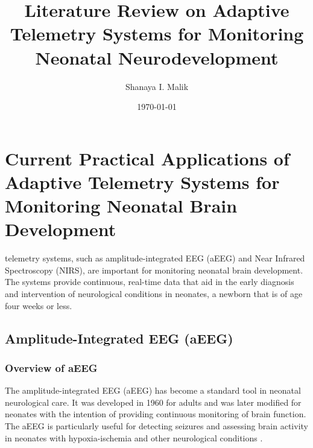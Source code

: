 \documentclass[12pt,journal,compsoc]{IEEEtran}
\begin{document}
\title{Literature Review on Adaptive Telemetry Systems for Monitoring Neonatal Neurodevelopment}
\author{Shanaya I. Malik}

\date{\today}

%


\maketitle


\section{Current Practical Applications of Adaptive Telemetry Systems for Monitoring Neonatal Brain Development}

 telemetry systems, such as amplitude-integrated EEG (aEEG) and Near Infrared Spectroscopy (NIRS), are important for monitoring neonatal brain development. The systems provide continuous, real-time data that aid in the early diagnosis and intervention of neurological conditions in neonates, a newborn that is of age four weeks or less. 

\subsection{Amplitude-Integrated EEG (aEEG)}

\subsubsection{Overview of aEEG}
The amplitude-integrated EEG (aEEG) has become a standard tool in neonatal neurological care. It was developed in 1960 for adults and was later modified for neonates with the intention of providing continuous monitoring of brain function. The aEEG is particularly useful for detecting seizures and assessing brain activity in neonates with hypoxia-ischemia and other neurological conditions \cite{IEEEhowto:toet}.
\end{document}
